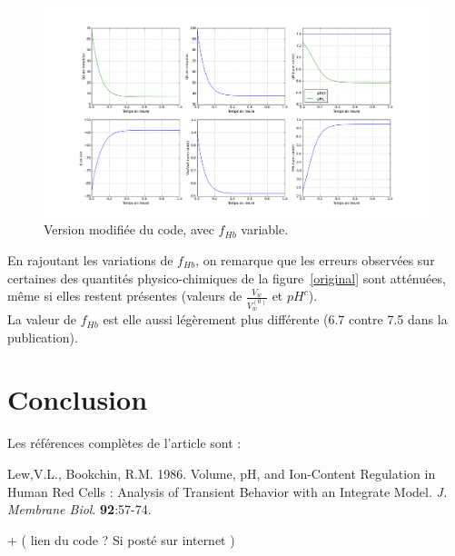 \documentclass[a4paper,fleqn]{article}
\begin{document}
\begin{figure}[H]
\centering 
\includegraphics[width=1.1\textwidth]{avec_fhb.png}
\caption{Version modifiée du code, avec $f_{Hb}$ variable.}
\end{figure} 

En rajoutant les variations de $f_{Hb}$, on remarque que les erreurs observées sur certaines des quantités physico-chimiques de la figure~\ref{original} sont atténuées, même si elles restent présentes (valeurs de $\frac{V_w}{V_w^{(0)}}$ et $pH^c$). \\

La valeur de $f_{Hb}$ est elle aussi légèrement plus différente (6.7 contre 7.5 dans la publication).\\


\section{Conclusion} 

Les références complètes de l'article sont :

Lew,V.L., Bookchin, R.M. 1986. Volume, pH, and Ion-Content Regulation in Human Red Cells : Analysis of Transient Behavior with  an Integrate Model. \textit{J. Membrane Biol}. \textbf{92}:57-74.


+ ( lien du code ? Si posté sur internet )
 







\end{document}
